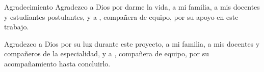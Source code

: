 \begin{estilodedicatoria}{Agradecimiento}
Agradezco a Dios por darme la vida, a mi familia, a mis docentes y estudiantes postulantes, y a \autordos, compañera de equipo, por su apoyo en este trabajo.
\hfill\textbf{\autoruno}

\bigskip

Agradezco a Dios por su luz durante este proyecto, a mi familia, a mis docentes y compañeros de la especialidad, y a \autoruno, compañera de equipo, por su acompañamiento hasta concluirlo.
\hfill\textbf{\autordos}
\end{estilodedicatoria}
